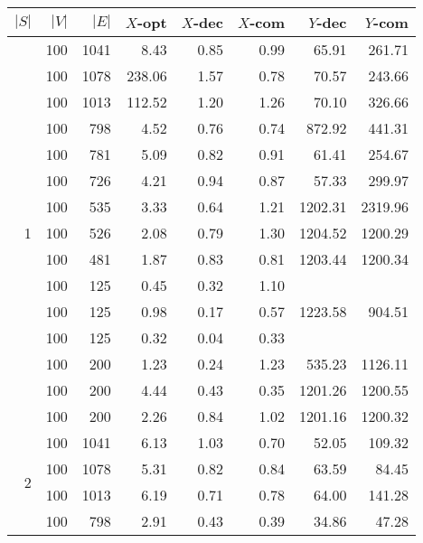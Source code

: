 \begin{table}[]
\begin{tabular}{rrrrrrrr}
$|S|$               & $|V|$ & $|E|$ & $X$-opt & $X$-dec & $X$-com & $Y$-dec & $Y$-com \\\hline
\multirow{15}{*}{1} & 100   & 1041  & 8.43    & 0.85    & 0.99    & 65.91   & 261.71  \\
                    & 100   & 1078  & 238.06  & 1.57    & 0.78    & 70.57   & 243.66  \\
                    & 100   & 1013  & 112.52  & 1.20    & 1.26    & 70.10   & 326.66  \\
                    & 100   & 798   & 4.52    & 0.76    & 0.74    & 872.92  & 441.31  \\
                    & 100   & 781   & 5.09    & 0.82    & 0.91    & 61.41   & 254.67  \\
                    & 100   & 726   & 4.21    & 0.94    & 0.87    & 57.33   & 299.97  \\
                    & 100   & 535   & 3.33    & 0.64    & 1.21    & 1202.31 & 2319.96 \\
                    & 100   & 526   & 2.08    & 0.79    & 1.30    & 1204.52 & 1200.29 \\
                    & 100   & 481   & 1.87    & 0.83    & 0.81    & 1203.44 & 1200.34 \\
                    & 100   & 125   & 0.45    & 0.32    & 1.10    &         &         \\
                    & 100   & 125   & 0.98    & 0.17    & 0.57    & 1223.58 & 904.51  \\
                    & 100   & 125   & 0.32    & 0.04    & 0.33    &         &         \\
                    & 100   & 200   & 1.23    & 0.24    & 1.23    & 535.23  & 1126.11 \\
                    & 100   & 200   & 4.44    & 0.43    & 0.35    & 1201.26 & 1200.55 \\
                    & 100   & 200   & 2.26    & 0.84    & 1.02    & 1201.16 & 1200.32 \\\hline
\multirow{15}{*}{2} & 100   & 1041  & 6.13    & 1.03    & 0.70    & 52.05   & 109.32  \\
                    & 100   & 1078  & 5.31    & 0.82    & 0.84    & 63.59   & 84.45   \\
                    & 100   & 1013  & 6.19    & 0.71    & 0.78    & 64.00   & 141.28  \\
                    & 100   & 798   & 2.91    & 0.43    & 0.39    & 34.86   & 47.28   \\

\end{tabular}
\end{table}
